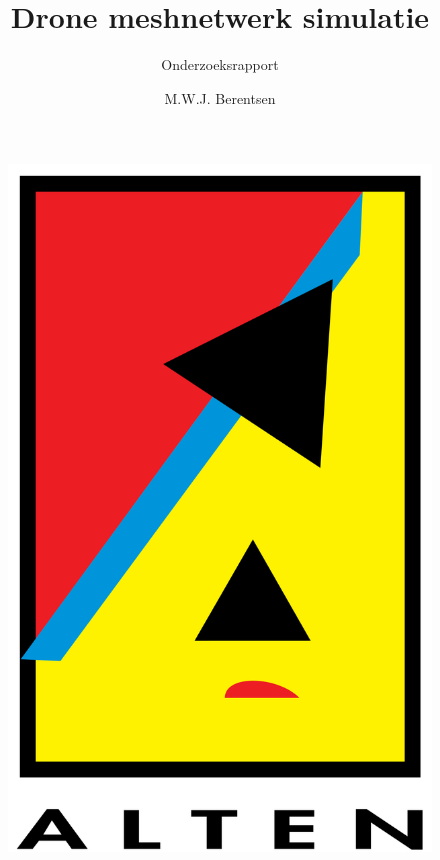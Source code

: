 \documentclass[a4paper, 11pt, oneside]{report}
\author{M.W.J. Berentsen}
\title{\myfont Drone meshnetwerk simulatie}
\subtitle{Onderzoeksrapport}{Versie 1.0}{Alten Nederland B.V.}{Hogeschool van Arnhem en Nijmegen}{HBO Technische Informatica - Embedded Software Developement }{MWJ.Berentsen@student.han.nl}{Studentnummer: 561399}{Docent: J. Visch, MSc}{Assessor: ir. C.G.R. van Uffelen}
\begin{document}
\begin{figure}
\begin{center}\includegraphics[scale=0.1]{alten}\end{center}
\end{figure}
\maketitle

\end{document}
